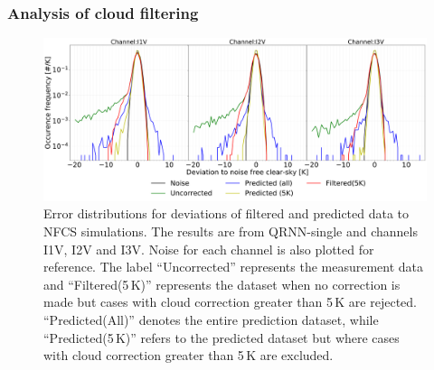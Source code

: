 \documentclass[amt, manuscript]{copernicus}
\begin{document}
\subsubsection{Analysis of cloud filtering}
%
\label{sec:cloud_filtering}
\begin{figure}[t ]
	\includegraphics[width=\textwidth]{Figures/error_distribution_QRNN-single.pdf} 
	\caption{Error distributions for deviations of filtered and predicted data to NFCS simulations. The results are from QRNN-single and channels I1V, I2V and I3V. Noise for each channel is also plotted for reference. The label ``Uncorrected'' represents the measurement data and ``Filtered(5\,K)'' represents the dataset when no correction is made but cases with cloud correction greater than 5\,K are rejected. ``Predicted(All)'' denotes the entire prediction dataset, while ``Predicted(5\,K)'' refers to the predicted dataset but where cases with cloud correction greater than 5\,K are excluded.}
	\label{fig:error_distributions}	
\end{figure}
\end{document}
